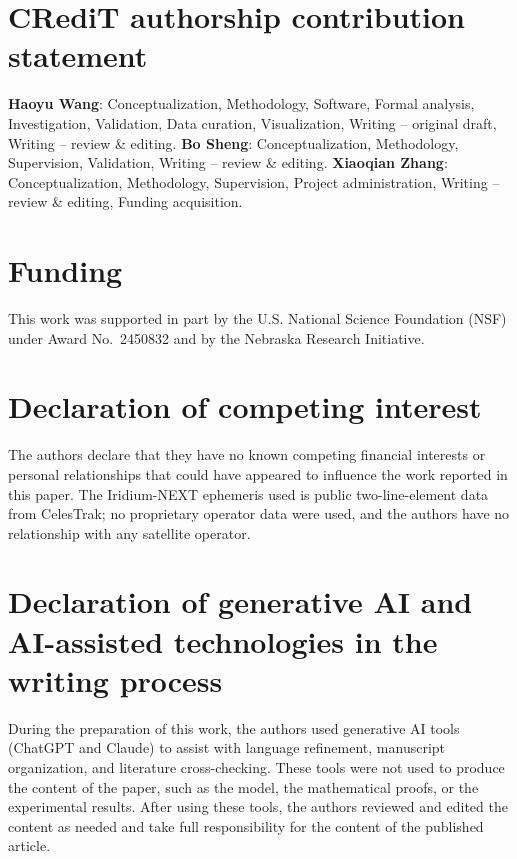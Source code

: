 \documentclass[twocolumn,3p,times,procedia]{elsarticle}
\theoremstyle{plain}
\theoremstyle{remark}
\begin{document}
\section*{CRediT authorship contribution statement}
\textbf{Haoyu Wang}: Conceptualization, Methodology, Software, Formal
analysis, Investigation, Validation, Data curation, Visualization,
Writing -- original draft, Writing -- review \& editing.
\textbf{Bo Sheng}: Conceptualization, Methodology, Supervision,
Validation, Writing -- review \& editing.
\textbf{Xiaoqian Zhang}: Conceptualization, Methodology, Supervision,
Project administration, Writing -- review \& editing, Funding
acquisition.

\section*{Funding}
This work was supported in part by the U.S. National Science Foundation
(NSF) under Award No.~2450832 and by the Nebraska Research Initiative.

\section*{Declaration of competing interest}
The authors declare that they have no known competing financial
interests or personal relationships that could have appeared to
influence the work reported in this paper. The Iridium-NEXT ephemeris
used is public two-line-element data from CelesTrak; no proprietary
operator data were used, and the authors have no relationship with any
satellite operator.

\section*{Declaration of generative AI and AI-assisted technologies
in the writing process}
During the preparation of this work, the authors used generative AI
tools (ChatGPT and Claude) to assist with language refinement,
manuscript organization, and literature cross-checking. These tools
were not used to produce the content of the paper, such as the model,
the mathematical proofs, or the experimental results. After using
these tools, the authors reviewed and edited the content as needed
and take full responsibility for the content of the published article.
\end{document}
